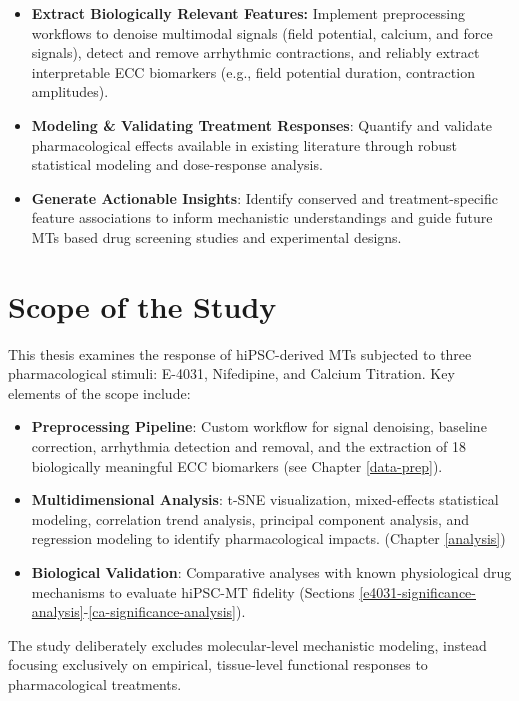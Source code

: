 \documentclass{report}
\begin{document}
\begin{itemize}
    \item \textbf{Extract Biologically Relevant Features:} Implement preprocessing workflows to denoise multimodal signals (field potential, calcium, and force signals), detect and remove arrhythmic contractions, and reliably extract interpretable ECC biomarkers (e.g., field potential duration, contraction amplitudes).

\item \textbf{Modeling \& Validating Treatment Responses}: Quantify and validate pharmacological effects available in existing literature through robust statistical modeling and dose-response analysis.

\item \textbf{Generate Actionable Insights}: Identify conserved and treatment-specific feature associations to inform mechanistic understandings and guide future MTs based drug screening studies and experimental designs.
\end{itemize}

\section{Scope of the Study}
This thesis examines the response of hiPSC-derived MTs subjected to three pharmacological stimuli: E-4031, Nifedipine, and Calcium Titration. Key elements of the scope include:

\begin{itemize}
\item \textbf{Preprocessing Pipeline}: Custom workflow for signal denoising, baseline correction, arrhythmia detection and removal, and the extraction of 18 biologically meaningful ECC biomarkers (see Chapter \ref{data-prep}).

\item \textbf{Multidimensional Analysis}: t-SNE visualization, mixed-effects statistical modeling, correlation trend analysis, principal component analysis, and regression modeling to identify pharmacological impacts. (Chapter \ref{analysis})

\item \textbf{Biological Validation}: Comparative analyses with known physiological drug mechanisms to evaluate hiPSC-MT fidelity (Sections \ref{e4031-significance-analysis}-\ref{ca-significance-analysis}).
\end{itemize}

The study deliberately excludes molecular-level mechanistic modeling, instead focusing exclusively on empirical, tissue-level functional responses to pharmacological treatments.
\end{document}
